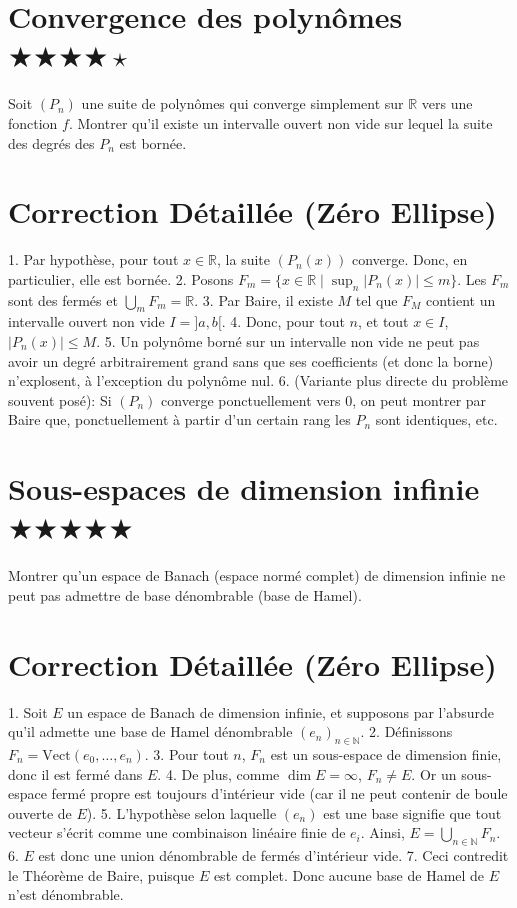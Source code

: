 \documentclass[11pt,a4paper]{article}
\begin{document}
\newpage

\section{Convergence des polynômes \quad $\bigstar\bigstar\bigstar\bigstar\star$}

Soit $(P_n)$ une suite de polynômes qui converge simplement sur $\mathbb{R}$ vers une fonction $f$. Montrer qu'il existe un intervalle ouvert non vide sur lequel la suite des degrés des $P_n$ est bornée.

\section{Correction Détaillée (Zéro Ellipse)}


1. Par hypothèse, pour tout $x \in \mathbb{R}$, la suite $(P_n(x))$ converge. Donc, en particulier, elle est bornée.
2. Posons $F_m = \{x \in \mathbb{R} \mid \sup_n |P_n(x)| \leq m\}$. Les $F_m$ sont des fermés et $\bigcup_{m} F_m = \mathbb{R}$.
3. Par Baire, il existe $M$ tel que $F_M$ contient un intervalle ouvert non vide $I = ]a, b[$.
4. Donc, pour tout $n$, et tout $x \in I$, $|P_n(x)| \leq M$.
5. Un polynôme borné sur un intervalle non vide ne peut pas avoir un degré arbitrairement grand sans que ses coefficients (et donc la borne) n'explosent, à l'exception du polynôme nul.
6. (Variante plus directe du problème souvent posé): Si $(P_n)$ converge ponctuellement vers 0, on peut montrer par Baire que, ponctuellement à partir d'un certain rang les $P_n$ sont identiques, etc.


\newpage

\section{Sous-espaces de dimension infinie \quad $\bigstar\bigstar\bigstar\bigstar\bigstar$}

Montrer qu'un espace de Banach (espace normé complet) de dimension infinie ne peut pas admettre de base dénombrable (base de Hamel).

\section{Correction Détaillée (Zéro Ellipse)}


1. Soit $E$ un espace de Banach de dimension infinie, et supposons par l'absurde qu'il admette une base de Hamel dénombrable $(e_n)_{n \in \mathbb{N}}$.
2. Définissons $F_n = \text{Vect}(e_0, \dots, e_n)$.
3. Pour tout $n$, $F_n$ est un sous-espace de dimension finie, donc il est fermé dans $E$.
4. De plus, comme $\dim E = \infty$, $F_n \neq E$. Or un sous-espace fermé propre est toujours d'intérieur vide (car il ne peut contenir de boule ouverte de $E$).
5. L'hypothèse selon laquelle $(e_n)$ est une base signifie que tout vecteur s'écrit comme une combinaison linéaire finie de $e_i$. Ainsi, $E = \bigcup_{n \in \mathbb{N}} F_n$.
6. $E$ est donc une union dénombrable de fermés d'intérieur vide.
7. Ceci contredit le Théorème de Baire, puisque $E$ est complet. Donc aucune base de Hamel de $E$ n'est dénombrable.
\end{document}
